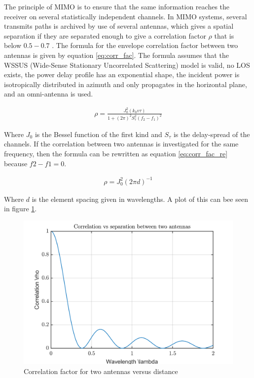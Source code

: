 The principle of MIMO is to ensure that the same information reaches the receiver on several
statistically independent channels. In MIMO systems, several transmits paths is archived by use of several antennas, which gives a spatial separation if they are separated enough to give a correlation factor $\rho$ that is below $0.5 - 0.7$ \citep{molisch2011}. The formula for the envelope correlation factor between two antennas is given by equation \ref{eq:corr_fac}. The formula assumes that the WSSUS (Wide-Sense Stationary Uncorrelated Scattering) model is valid, no LOS exists, the power delay profile has an exponential shape, the incident power is isotropically distributed in azimuth and only propagates in the horizontal plane, and an omni-antenna is used.

\begin{eqnarray} \label{eq:corr_fac}
\rho = \frac{J_0^2( k_0 v \tau)}{1+(2\pi)^2 S_\tau^2(f_2 - f_1)^2 }
\end{eqnarray}      

Where $J_0$ is the Bessel function of the first kind and $S_\tau$ is the delay-spread of the channels. If the correlation between two antennas is investigated for the same frequency, then the formula can be rewritten as equation \ref{eq:corr_fac_re} because $f2-f1=0$.

\begin{eqnarray} \label{eq:corr_fac_re}
\rho = J_0^2( 2\pi d)^{-1}
\end{eqnarray} 

Where $d$ is the element spacing given in wavelengths. A plot of this can bee seen in figure \ref{fig:correlation}.

\begin{figure}[H]
\centering 
\includegraphics[scale = 0.7]{figures/ch1/correlation.png}
\caption{Correlation factor for two antennas versus distance}
\label{fig:correlation}
\end{figure}

